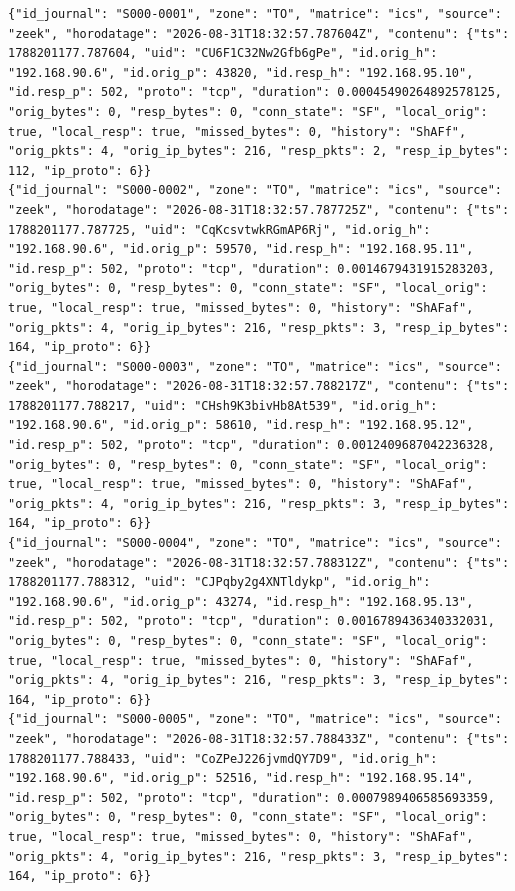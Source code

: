 \begin{lstlisting}[style=jsonfull]
{"id_journal": "S000-0001", "zone": "TO", "matrice": "ics", "source": "zeek", "horodatage": "2026-08-31T18:32:57.787604Z", "contenu": {"ts": 1788201177.787604, "uid": "CU6F1C32Nw2Gfb6gPe", "id.orig_h": "192.168.90.6", "id.orig_p": 43820, "id.resp_h": "192.168.95.10", "id.resp_p": 502, "proto": "tcp", "duration": 0.00045490264892578125, "orig_bytes": 0, "resp_bytes": 0, "conn_state": "SF", "local_orig": true, "local_resp": true, "missed_bytes": 0, "history": "ShAFf", "orig_pkts": 4, "orig_ip_bytes": 216, "resp_pkts": 2, "resp_ip_bytes": 112, "ip_proto": 6}}
{"id_journal": "S000-0002", "zone": "TO", "matrice": "ics", "source": "zeek", "horodatage": "2026-08-31T18:32:57.787725Z", "contenu": {"ts": 1788201177.787725, "uid": "CqKcsvtwkRGmAP6Rj", "id.orig_h": "192.168.90.6", "id.orig_p": 59570, "id.resp_h": "192.168.95.11", "id.resp_p": 502, "proto": "tcp", "duration": 0.0014679431915283203, "orig_bytes": 0, "resp_bytes": 0, "conn_state": "SF", "local_orig": true, "local_resp": true, "missed_bytes": 0, "history": "ShAFaf", "orig_pkts": 4, "orig_ip_bytes": 216, "resp_pkts": 3, "resp_ip_bytes": 164, "ip_proto": 6}}
{"id_journal": "S000-0003", "zone": "TO", "matrice": "ics", "source": "zeek", "horodatage": "2026-08-31T18:32:57.788217Z", "contenu": {"ts": 1788201177.788217, "uid": "CHsh9K3bivHb8At539", "id.orig_h": "192.168.90.6", "id.orig_p": 58610, "id.resp_h": "192.168.95.12", "id.resp_p": 502, "proto": "tcp", "duration": 0.0012409687042236328, "orig_bytes": 0, "resp_bytes": 0, "conn_state": "SF", "local_orig": true, "local_resp": true, "missed_bytes": 0, "history": "ShAFaf", "orig_pkts": 4, "orig_ip_bytes": 216, "resp_pkts": 3, "resp_ip_bytes": 164, "ip_proto": 6}}
{"id_journal": "S000-0004", "zone": "TO", "matrice": "ics", "source": "zeek", "horodatage": "2026-08-31T18:32:57.788312Z", "contenu": {"ts": 1788201177.788312, "uid": "CJPqby2g4XNTldykp", "id.orig_h": "192.168.90.6", "id.orig_p": 43274, "id.resp_h": "192.168.95.13", "id.resp_p": 502, "proto": "tcp", "duration": 0.0016789436340332031, "orig_bytes": 0, "resp_bytes": 0, "conn_state": "SF", "local_orig": true, "local_resp": true, "missed_bytes": 0, "history": "ShAFaf", "orig_pkts": 4, "orig_ip_bytes": 216, "resp_pkts": 3, "resp_ip_bytes": 164, "ip_proto": 6}}
{"id_journal": "S000-0005", "zone": "TO", "matrice": "ics", "source": "zeek", "horodatage": "2026-08-31T18:32:57.788433Z", "contenu": {"ts": 1788201177.788433, "uid": "CoZPeJ226jvmdQY7D9", "id.orig_h": "192.168.90.6", "id.orig_p": 52516, "id.resp_h": "192.168.95.14", "id.resp_p": 502, "proto": "tcp", "duration": 0.0007989406585693359, "orig_bytes": 0, "resp_bytes": 0, "conn_state": "SF", "local_orig": true, "local_resp": true, "missed_bytes": 0, "history": "ShAFaf", "orig_pkts": 4, "orig_ip_bytes": 216, "resp_pkts": 3, "resp_ip_bytes": 164, "ip_proto": 6}}

\end{lstlisting}
